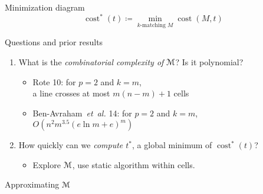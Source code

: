 \documentclass[xcolor={dvipsnames,usenames},handout]{beamer} %
\newcommand{\mycite}[1]{{\color{violet}\lbrack #1\rbrack}}
\newcommand{\etal}{\textit{et~al.}}
\DeclareMathOperator{\cost}{cost}
\newcommand{\M}{\EuScript{M}}
\def\EMPH#1{\textcolor{BrickRed}{{\emph{#1}}}}
\begin{document}
\begin{frame}{Minimization diagram}
\begin{equation*}
\cost^*(t) \coloneqq \min_{\text{$k$-matching $M$}} \cost(M, t)
\end{equation*}

\end{frame}

\begin{frame}{Questions and prior results}
\begin{enumerate}
\item {\large What is the \EMPH{combinatorial complexity of $\M$}? Is it polynomial?}
	\begin{itemize}
	\item \mycite{Rote 10}: for $p=2$ and $k=m$, \\
		a line crosses at most $m(n-m) + 1$ cells 
	\item \mycite{Ben-Avraham~{\etal} 14}: for $p=2$ and $k=m$, \\
		$O(n^2 m^{3.5}(e \ln m + e)^m)$ 
	\end{itemize}
\item {\large How quickly can we \EMPH{compute $t^*$}, a global minimum of $\cost^*(t)$?}
	\begin{itemize}
	\item Explore $\M$, use static algorithm within cells.
	\end{itemize}
\end{enumerate}
\end{frame}

\begin{frame}{Approximating $\M$}
\end{frame}
\end{document}
